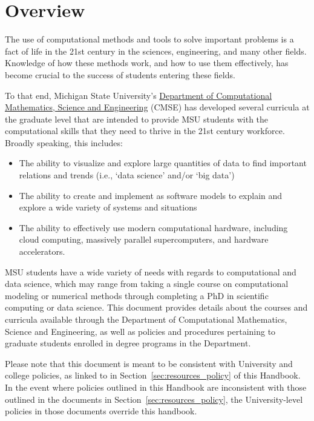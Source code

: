 \section{Overview}
\label{sec:overview}

The use of computational methods and tools to solve important problems
is a fact of life in the 21st century in the sciences, engineering,
and many other fields.  Knowledge of how these methods work, and how
to use them effectively, has become crucial to the success of students
entering these fields.

To that end, Michigan State University's \href{http://cmse.msu.edu}{Department of Computational
Mathematics, Science and Engineering} (CMSE) has developed several
curricula at the graduate level that are intended to provide MSU
students with the computational skills that they need to thrive in the
21st century workforce.  Broadly speaking, this includes:

\begin{itemize}
\item The ability to visualize and explore large quantities of data to
  find important relations and trends (i.e., `data science' and/or
  `big data')

\item The ability to create and implement as software models to
  explain and explore a wide variety of systems and situations

\item The ability to effectively use modern computational hardware,
  including cloud computing, massively parallel supercomputers, and
  hardware accelerators.

\end{itemize}

MSU students have a wide variety of needs with regards to
computational and data science, which may range from taking a single
course on computational modeling or numerical methods through
completing a PhD in scientific computing or data science.  This
document provides details about the courses and curricula available
through the Department of Computational Mathematics, Science and
Engineering, as well as policies and procedures pertaining to graduate
students enrolled in degree programs in the Department.

Please note that this document is meant to be consistent with
University and college policies, as linked to in
Section~\ref{sec:resources_policy} of this Handbook.  In the event
where policies outlined in this Handbook are inconsistent with those
outlined in the documents in Section~\ref{sec:resources_policy}, the
University-level policies in those documents override this handbook.





